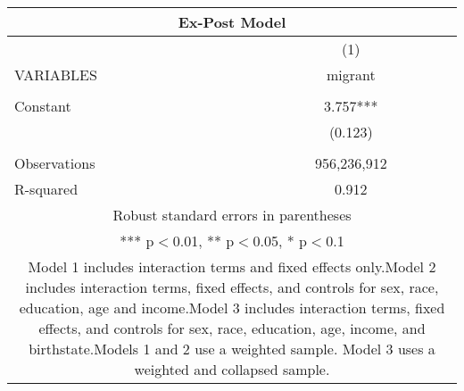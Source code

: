 \begin{tabular}{lc}
\multicolumn{2}{c}{Ex-Post Model} \\ \hline
 & (1) \\
VARIABLES & migrant \\ \hline
 &  \\
Constant & 3.757*** \\
 & (0.123) \\
 &  \\
Observations & 956,236,912 \\
 R-squared & 0.912 \\ \hline
\multicolumn{2}{c}{ Robust standard errors in parentheses} \\
\multicolumn{2}{c}{ *** p$<$0.01, ** p$<$0.05, * p$<$0.1} \\
\multicolumn{2}{c}{ Model 1 includes interaction terms and fixed effects only.\n Model 2 includes interaction terms, fixed effects, and controls for sex, race, education, age and income.\n Model 3 includes interaction terms, fixed effects, and controls for sex, race, education, age, income, and birthstate.\n Models 1 and 2 use a weighted sample. Model 3 uses a weighted and collapsed sample.} \\
\end{tabular}

